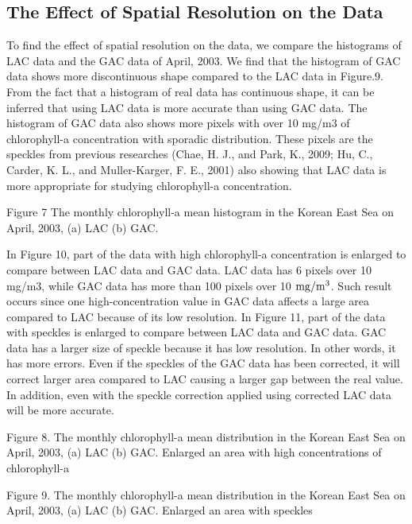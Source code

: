 \subsection{The Effect of Spatial Resolution on the Data}
 
To find the effect of spatial resolution on the data, we compare the histograms of LAC data and the GAC data of April, 2003. We find that the histogram of GAC data shows more discontinuous shape compared to the LAC data in Figure.9. From the fact that a histogram of real data has continuous shape, it can be inferred that using LAC data is more accurate than using GAC data. The histogram of GAC data also shows more pixels with over 10 mg/m3 of chlorophyll-a concentration with sporadic distribution. These pixels are the speckles from previous researches (Chae, H. J., and Park, K., 2009; Hu, C., Carder, K. L., and Muller-Karger, F. E., 2001) also showing that LAC data is more appropriate for studying chlorophyll-a concentration.
  
  
  Figure 7 The monthly chlorophyll-a mean histogram in the Korean East Sea on April, 2003, (a) LAC (b) GAC.
  
  
   In Figure 10, part of the data with high chlorophyll-a concentration is enlarged to compare between LAC data and GAC data. LAC data has 6 pixels over 10 mg/m3, while GAC data has more than 100 pixels over 10 $\rm mg/m^3$. Such result occurs since one high-concentration value in GAC data affects a large area compared to LAC because of its low resolution.
  In Figure 11, part of the data with speckles is enlarged to compare between LAC data and GAC data. GAC data has a larger size of speckle because it has low resolution. In other words, it has more errors. Even if the speckles of the GAC data has been corrected, it will correct larger area compared to LAC causing a larger gap between the real value. In addition, even with the speckle correction applied using corrected LAC data will be more accurate.
  
  Figure 8. The monthly chlorophyll-a mean distribution in the Korean East Sea on April, 2003, (a) LAC (b) GAC. Enlarged an area with high concentrations of chlorophyll-a
  
  Figure 9. The monthly chlorophyll-a mean distribution in the Korean East Sea on April, 2003, (a) LAC (b) GAC. Enlarged an area with speckles
  

  